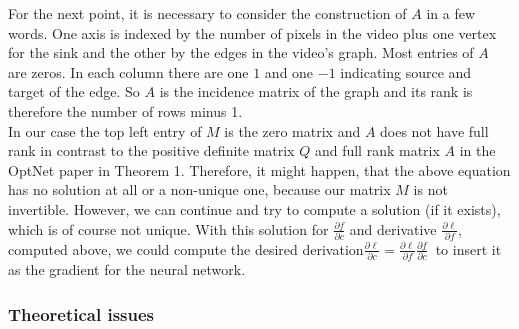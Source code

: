 \documentclass{article}
\begin{document}
{For the next point, it is necessary to consider the construction of $A$ in a few words. One axis is indexed by the number of pixels in the video plus one vertex for the sink and the other by the edges in the video's graph. Most entries of $A$ are zeros. In each column there are one $1$ and one $-1$ indicating source and target of the edge. So $A$ is the incidence matrix of the graph and its rank is therefore the number of rows minus 1.\\
In our case the top left entry of $M$ is the zero matrix and $A$ does not have full rank in contrast to the positive definite matrix $Q$ and full rank matrix $A$ in the OptNet paper in Theorem 1. Therefore, it might happen, that the above equation has no solution at all or a non-unique one, because our matrix $M$ is not invertible. However, we can continue and try to compute a solution (if it exists), which is of course not unique. With this solution for $\frac{\partial f}{\partial c}$ and derivative $\frac{\partial \ell}{\partial f}$, computed above, we could compute the desired derivation$\frac{\partial \ell }{\partial c} = \frac{\partial \ell}{\partial f} \frac{\partial f}{\partial c}~
$ to insert it as the gradient for the neural network. 

\subsubsection{Theoretical issues}

}
\end{document}
